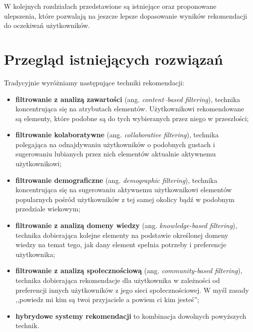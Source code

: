 \documentclass[twoside]{iisthesis}
\begin{document}
	 
	 W kolejnych rozdziałach przedstawione są istniejące oraz proponowane ulepszenia, które pozwalają na jeszcze lepsze dopasowanie wyników rekomendacji do oczekiwań użytkowników. 
	 
	 
 
 \chapter{Przegląd istniejących rozwiązań}
	 Tradycyjnie wyróżniamy następujące techniki rekomendacji: 
	 
	 \begin{itemize}
	 	\item \textbf{filtrowanie z analizą zawartości} (ang. \textit{content--based filtering}), technika koncentrująca się na atrybutach elementów. Użytkownikowi rekomendowane są elementy, które podobne są do tych wybieranych przez niego w przeszłości;
	 	\item \textbf{filtrowanie kolaboratywne} (ang. \textit{collaborative filtering}), technika polegająca na odnajdywaniu użytkowników o podobnych gustach i sugerowaniu lubianych przez nich elementów aktualnie aktywnemu użytkownikowi;
	 	\item \textbf{filtrowanie demograficzne} (ang. \textit{demographic filtering}), technika koncentrująca się na sugerowaniu aktywnemu użytkownikowi elementów popularnych pośród użytkowników z tej samej okolicy bądź w podobnym przedziale wiekowym;
	 	\item \textbf{filtrowanie z analizą domeny wiedzy} (ang. \textit{knowledge-based filtering}), technika dobierająca kolejne elementy na podstawie określonej domeny wiedzy na temat tego, jak dany element spełnia potrzeby i preferencje użytkownika;	
	 	\item \textbf{filtrowanie z analizą społecznościową} (ang. \textit{community-based filtering}), technika dobierająca rekomendacje dla użytkownika w zależności od preferencji innych użytkowników z jego sieci społecznościowej. W myśl zasady ,,powiedz mi kim są twoi przyjaciele a powiem ci kim jesteś'';
	 	\item \textbf{hybrydowe systemy rekomendacji} to kombinacja dowolnych powyższych technik.
	 \end{itemize}
	 
\end{document}
